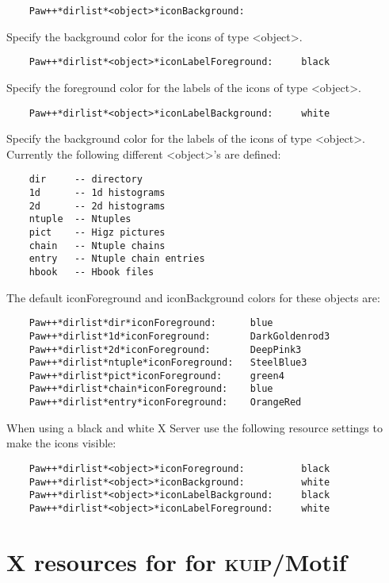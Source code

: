 \documentclass[11pt]{cernman}
\renewcommand{\KUIP}{\textsc{kuip}\index{KUIP}}
\newcommand{\MOTIF}{{\sf Motif}\index{Motif}}
\begin{document}
\begin{verbatim}
    Paw++*dirlist*<object>*iconBackground:
\end{verbatim}

   Specify the background color for the icons of type <object>.

\begin{verbatim}
    Paw++*dirlist*<object>*iconLabelForeground:     black
\end{verbatim}

   Specify the foreground color for the labels of the icons of type <object>.

\begin{verbatim}
    Paw++*dirlist*<object>*iconLabelBackground:     white
\end{verbatim}

   Specify the background color for the labels of the icons of type <object>.
   Currently the following different <object>'s are defined:

\begin{verbatim}
    dir     -- directory
    1d      -- 1d histograms
    2d      -- 2d histograms
    ntuple  -- Ntuples
    pict    -- Higz pictures
    chain   -- Ntuple chains
    entry   -- Ntuple chain entries
    hbook   -- Hbook files
\end{verbatim}

   The default iconForeground and iconBackground colors for these objects are:

\begin{verbatim}
    Paw++*dirlist*dir*iconForeground:      blue
    Paw++*dirlist*1d*iconForeground:       DarkGoldenrod3
    Paw++*dirlist*2d*iconForeground:       DeepPink3
    Paw++*dirlist*ntuple*iconForeground:   SteelBlue3
    Paw++*dirlist*pict*iconForeground:     green4
    Paw++*dirlist*chain*iconForeground:    blue
    Paw++*dirlist*entry*iconForeground:    OrangeRed
\end{verbatim}

   When using a black and white X Server use the following resource settings
   to make the icons visible:

\begin{verbatim}
    Paw++*dirlist*<object>*iconForeground:          black
    Paw++*dirlist*<object>*iconBackground:          white
    Paw++*dirlist*<object>*iconLabelBackground:     black
    Paw++*dirlist*<object>*iconLabelForeground:     white
\end{verbatim}

\section{X resources for for \KUIP/\MOTIF}
\end{document}
